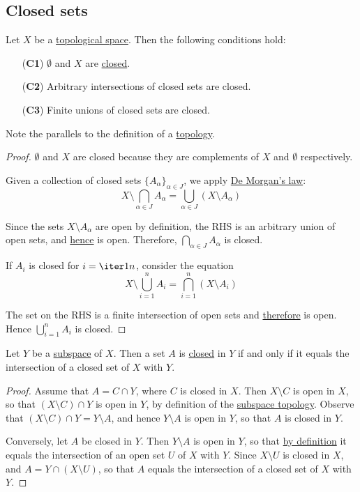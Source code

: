 \subsection{Closed sets}\label{cacf885}

\label{e48d738}

Let $X$ be a \href{de3c1b1}{topological space}. Then the following conditions
hold:
\begin{itemize}
  \item[(\textbf{C1})] $\emptyset$ and $X$ are \href{dd23fec}{closed}.
  \item[(\textbf{C2})] Arbitrary intersections of closed sets are closed.
  \item[(\textbf{C3})] Finite unions of closed sets are closed.
\end{itemize}

Note the parallels to the definition of a \href{cc8eb8b}{topology}.

\begin{proof}
   $\emptyset$ and $X$ are closed because they are complements of $X$
  and $\emptyset$ respectively.

   Given a collection of closed sets $\{A_\alpha\}_{\alpha\in J}$, we
  apply \href{c28492b}{De Morgan's law}:
  $$
    X\setminus\bigcap_{\alpha\in J}A_\alpha=\bigcup_{\alpha\in J}(X\setminus A_\alpha)
  $$

  Since the sets $X\setminus A_\alpha$ are open by definition, the RHS is an
  arbitrary union of open sets, and \href{cc8eb8b}{hence} is open. Therefore,
  $\bigcap_{\alpha\in J}A_\alpha$ is closed.

   If $A_i$ is closed for $i=\iter1n$, consider the equation
  $$
    X\setminus\bigcup_{i=1}^nA_i=\bigcap_{i=1}^n(X\setminus A_i)
  $$

  The set on the RHS is a finite intersection of open sets and
  \href{cc8eb8b}{therefore} is open. Hence $\bigcup_{i=1}^nA_i$ is closed.
\end{proof}

\label{c1c7979}

Let $Y$ be a \href{cddfbd8}{subspace} of $X$. Then a set $A$ is
\href{dd23fec}{closed} in $Y$ if and only if it equals the intersection of a
closed set of $X$ with $Y$.

\begin{proof}
  Assume that $A=C\cap Y$, where $C$ is closed in $X$. Then $X\setminus C$ is
  open in $X$, so that $(X\setminus C)\cap Y$ is open in $Y$, by definition of
  the \href{cddfbd8}{subspace topology}. Observe that $(X\setminus C)\cap
  Y=Y\setminus A$, and hence $Y\setminus A$ is open in $Y$, so that $A$ is
  closed in $Y$.

  Conversely, let $A$ be closed in $Y$. Then $Y\setminus A$ is open in $Y$, so
  that \href{cddfbd8}{by definition} it equals the intersection of an open set
  $U$ of $X$ with $Y$. Since $X\setminus U$ is closed in $X$, and
  $A=Y\cap(X\setminus U)$, so that $A$ equals the intersection of a closed set
  of $X$ with $Y$.
\end{proof}

